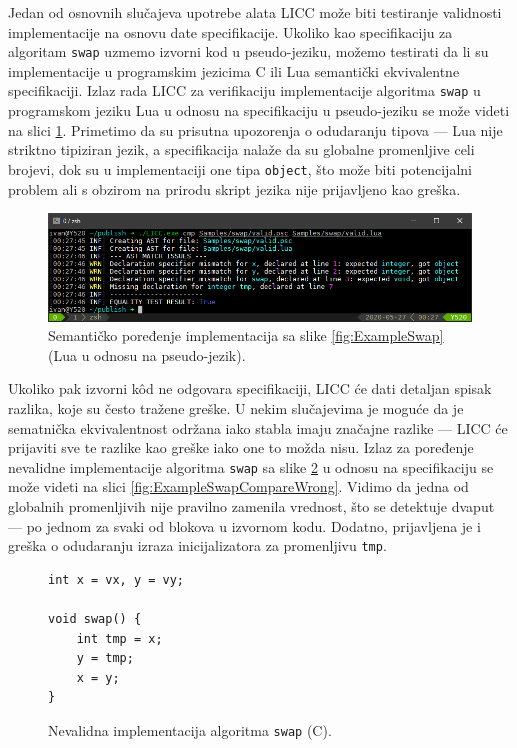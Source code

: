 Jedan od osnovnih slučajeva upotrebe alata LICC može biti testiranje validnosti implementacije na osnovu date specifikacije. Ukoliko kao specifikaciju za algoritam \texttt{swap} uzmemo izvorni kod u pseudo-jeziku, možemo testirati da li su implementacije u programskim jezicima C ili Lua semantički ekvivalentne specifikaciji. Izlaz rada LICC za verifikaciju implementacije algoritma \texttt{swap} u programskom jeziku Lua u odnosu na specifikaciju u pseudo-jeziku se može videti na slici \ref{fig:ExampleSwapCompareValid}. Primetimo da su prisutna upozorenja o odudaranju tipova --- Lua nije striktno tipiziran jezik, a specifikacija nalaže da su globalne promenljive celi brojevi, dok su u implementaciji one tipa \texttt{object}, što može biti potencijalni problem ali s obzirom na prirodu skript jezika nije prijavljeno kao greška.

\begin{figure}[h!]
\centering
\includegraphics[scale=0.65]{images/eval/cmp_valid.png}
\caption{Semantičko poređenje implementacija sa slike \ref{fig:ExampleSwap} (Lua u odnosu na pseudo-jezik).}
\label{fig:ExampleSwapCompareValid}
\end{figure}

Ukoliko pak izvorni k\^od ne odgovara specifikaciji, LICC će dati detaljan spisak razlika, koje su često tražene greške. U nekim slučajevima je moguće da je sematnička ekvivalentnost održana iako stabla imaju značajne razlike --- LICC će prijaviti sve te razlike kao greške iako one to možda nisu. Izlaz za poređenje nevalidne implementacije algoritma \texttt{swap} sa slike \ref{fig:ExampleSwapWrong} u odnosu na specifikaciju se može videti na slici \ref{fig:ExampleSwapCompareWrong}. Vidimo da jedna od globalnih promenljivih nije pravilno zamenila vrednost, što se detektuje dvaput --- po jednom za svaki od blokova u izvornom kodu. Dodatno, prijavljena je i greška o odudaranju izraza inicijalizatora za promenljivu \texttt{tmp}.

\begin{figure}[h!]
\begin{lstlisting}
int x = vx, y = vy;

void swap() {
    int tmp = x;
    y = tmp;
    x = y;
}
\end{lstlisting}
\caption{Nevalidna implementacija algoritma \texttt{swap} (C).}
\label{fig:ExampleSwapWrong}
\end{figure}

